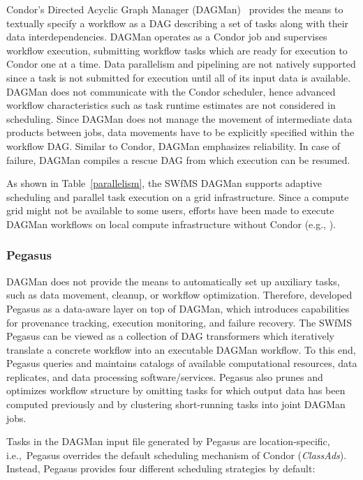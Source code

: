 Condor's Directed Acyclic Graph Manager (DAGMan)~\citep{Couvares2007} provides the means to textually specify a workflow as a DAG describing a set of tasks along with their data interdependencies. DAGMan operates as a Condor job and supervises workflow execution, submitting workflow tasks which are ready for execution to Condor one at a time. Data parallelism and pipelining are not natively supported since a task is not submitted for execution until all of its input data is available. DAGMan does not communicate with the Condor scheduler, hence advanced workflow characteristics such as task runtime estimates are not considered in scheduling. Since DAGMan does not manage the movement of intermediate data products between jobs, data movements have to be explicitly specified within the workflow DAG. Similar to Condor, DAGMan emphasizes reliability. In case of failure, DAGMan compiles a rescue DAG from which execution can be resumed.

As shown in Table~\ref{parallelism}, the SWfMS DAGMan supports adaptive scheduling and parallel task execution on a grid infrastructure. Since a compute grid might not be available to some users, efforts have been made to execute DAGMan workflows on local compute infrastructure without Condor (e.g., \citep{Schmidt2012}).

\subsubsection{Pegasus}
DAGMan does not provide the means to automatically set up auxiliary tasks, such as data movement, cleanup, or workflow optimization. Therefore, \citet{Deelman05} developed Pegasus as a data-aware layer on top of DAGMan, which introduces capabilities for provenance tracking, execution monitoring, and failure recovery. The SWfMS Pegasus can be viewed as a collection of DAG transformers which iteratively translate a concrete workflow into an executable DAGMan workflow. To this end, Pegasus queries and maintains catalogs of available computational resources, data replicates, and data processing software/services. Pegasus also prunes and optimizes workflow structure by omitting tasks for which output data has been computed previously and by clustering short-running tasks into joint DAGMan jobs.

Tasks in the DAGMan input file generated by Pegasus are location-specific, i.e.,~Pegasus overrides the default scheduling mechanism of Condor (\textit{ClassAds}). Instead, Pegasus provides four different scheduling strategies by default:

